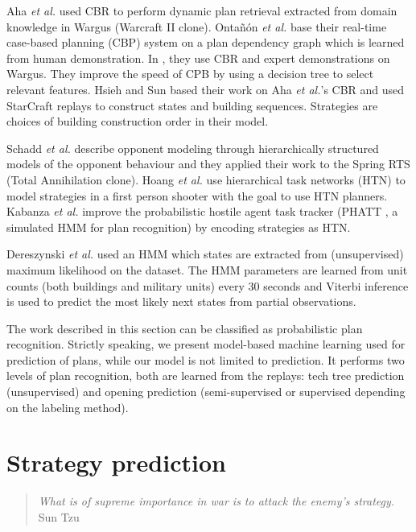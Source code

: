 Aha \textit{et al.} \citep{LTW} used CBR to perform dynamic plan retrieval extracted from domain knowledge in Wargus (Warcraft II clone). Onta\~{n}\'{o}n \textit{et al.} \citep{CBR_Planning} base their real-time case-based planning (CBP) system on a plan dependency graph which is learned from human demonstration. In \citep{OntanonCBR,PlanRetrieval}, they use CBR and expert demonstrations on Wargus. %
They improve the speed of CPB by using a decision tree to select relevant features. Hsieh and Sun \citep{HsiehS08} based their work on Aha \textit{et al.}'s CBR \citep{LTW} and used StarCraft replays to construct states and building sequences. Strategies are choices of building construction order in their model. 

Schadd \textit{et al.} \citep{schadd2007opponent} describe opponent modeling through hierarchically structured models of the opponent behaviour and they applied their work to the Spring RTS (Total Annihilation clone). Hoang \textit{et al.} \citep{HTNPlanning} use hierarchical task networks (HTN) to model strategies in a first person shooter with the goal to use HTN planners. Kabanza \textit{et al.} \citep{OBRecog} improve the probabilistic hostile agent task tracker (PHATT \citep{PHATT}, a simulated HMM for plan recognition) by encoding strategies as HTN. 

Dereszynski \textit{et al.} \citep{HMMstrat_RTS_AIIDE11} used an HMM which states are extracted from (unsupervised) maximum likelihood on the dataset. The HMM parameters are learned from unit counts (both buildings and military units) every 30 seconds and Viterbi inference is used to predict the most likely next states from partial observations. %

The work described in this section can be classified as probabilistic plan recognition. Strictly speaking, we present model-based machine learning used for prediction of plans, while our model is not limited to prediction. It performs two levels of plan recognition, both are learned from the replays: tech tree prediction (unsupervised) and opening prediction (semi-supervised or supervised depending on the labeling method).


\section{Strategy prediction}

\begin{quotation}\textit{
What is of supreme importance in war is to attack the enemy's strategy.}\\
Sun Tzu\end{quotation}

